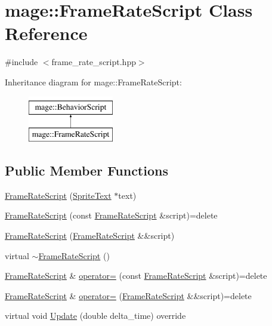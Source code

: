 \hypertarget{classmage_1_1_frame_rate_script}{}\section{mage\+:\+:Frame\+Rate\+Script Class Reference}
\label{classmage_1_1_frame_rate_script}


{\ttfamily \#include $<$frame\+\_\+rate\+\_\+script.\+hpp$>$}

Inheritance diagram for mage\+:\+:Frame\+Rate\+Script\+:\begin{figure}[H]
\begin{center}
\leavevmode
\includegraphics[height=2.000000cm]{classmage_1_1_frame_rate_script}
\end{center}
\end{figure}
\subsection*{Public Member Functions}
\begin{DoxyCompactItemize}
\item 
\hyperlink{classmage_1_1_frame_rate_script_a78ffb9aa23f42244ef34bd2dfaa7c537}{Frame\+Rate\+Script} (\hyperlink{classmage_1_1_sprite_text}{Sprite\+Text} $\ast$text)
\item 
\hyperlink{classmage_1_1_frame_rate_script_a2c76a1ce175c5c5370582d7ccb878132}{Frame\+Rate\+Script} (const \hyperlink{classmage_1_1_frame_rate_script}{Frame\+Rate\+Script} \&script)=delete
\item 
\hyperlink{classmage_1_1_frame_rate_script_af2cb69b7338169598b80938e9ad77cdd}{Frame\+Rate\+Script} (\hyperlink{classmage_1_1_frame_rate_script}{Frame\+Rate\+Script} \&\&script)
\item 
virtual \hyperlink{classmage_1_1_frame_rate_script_a0863d9339500e10d988dd574448c28f3}{$\sim$\+Frame\+Rate\+Script} ()
\item 
\hyperlink{classmage_1_1_frame_rate_script}{Frame\+Rate\+Script} \& \hyperlink{classmage_1_1_frame_rate_script_a2077ec2facadcde117a20d18e2f0e9b7}{operator=} (const \hyperlink{classmage_1_1_frame_rate_script}{Frame\+Rate\+Script} \&script)=delete
\item 
\hyperlink{classmage_1_1_frame_rate_script}{Frame\+Rate\+Script} \& \hyperlink{classmage_1_1_frame_rate_script_a828664f89350ac0da2da3da26c05a6f0}{operator=} (\hyperlink{classmage_1_1_frame_rate_script}{Frame\+Rate\+Script} \&\&script)=delete
\item 
virtual void \hyperlink{classmage_1_1_frame_rate_script_a9bab0b26279823f1387428268b30e034}{Update} (double delta\+\_\+time) override
\end{DoxyCompactItemize}
